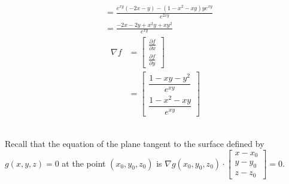 \begin{enumerate}
\begin{align*}
   &= \frac{e^{xy}(-2x - y) - (1 - x^2 - xy)ye^{xy}}{e^{2xy}} \\
   &= \frac{-2x - 2y + x^2y + xy^2}{e^{xy}}
 \end{align*}
 \begin{align*}
   \nabla f
   &= \begin{bmatrix}
       \frac{\partial f}{\partial x} \\
       \frac{\partial f}{\partial y}
      \end{bmatrix} \\
   &= \begin{bmatrix}
       \dfrac{1 - xy - y^2}{e^{xy}} \\
       \dfrac{1 - x^2 - xy}{e^{xy}}
      \end{bmatrix}
  \end{align*}

\end{enumerate}
\item
{}\\
 Recall that the equation of the plane tangent to the surface defined by
 $g(x,y,z) = 0$ at the point $(x_0, y_0, z_0)$ is $\nabla g(x_0,y_0,z_0)
 \cdot \begin{bmatrix} x - x_0 \\ y - y_0 \\ z - z_0 \end{bmatrix} = 0$.

